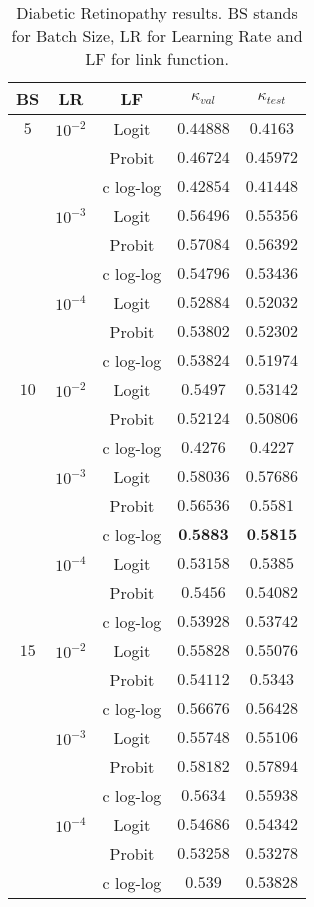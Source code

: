 \documentclass[10pt, a4paper, titlepage, twocolumn]{article}
\begin{document}
	\begin{table}[ht]
		\footnotesize
		\centering
		\begin{tabular}{ccc|cc}
			BS & LR & LF & $\kappa_{val}$ & $\kappa_{test}$\\\hline\addlinespace[0.05cm]
			$5$ & $10^{-2}$ & Logit & $0.44888$ & $0.4163$\\
			& & Probit & $0.46724$ & $0.45972$\\
			& & c log-log & $0.42854$ & $0.41448$\\
			& $10^{-3}$ & Logit & $0.56496$ & $0.55356$\\
			& & Probit & $0.57084$ & $0.56392$\\
			& & c log-log & $0.54796$ & $0.53436$\\
			& $10^{-4}$ & Logit & $0.52884$ & $0.52032$\\
			& & Probit & $0.53802$ & $0.52302$\\
			& & c log-log & $0.53824$ & $0.51974$\\
			$10$ & $10^{-2}$ & Logit & $0.5497$ & $0.53142$\\
			& & Probit & $0.52124$ & $0.50806$\\
			& & c log-log & $0.4276$ & $0.4227$\\
			& $10^{-3}$ & Logit & $0.58036$ & $0.57686$\\
			& & Probit & $0.56536$ & $0.5581$\\
			& & c log-log & $\textbf{0.5883}$ & $\textbf{0.5815}$\\
			& $10^{-4}$ & Logit & $0.53158$ & $0.5385$\\
			& & Probit & $0.5456$ & $0.54082$\\
			& & c log-log & $0.53928$ & $0.53742$\\
			$15$ & $10^{-2}$ & Logit & $0.55828$ & $0.55076$\\
			& & Probit & $0.54112$ & $0.5343$\\
			& & c log-log & $0.56676$ & $0.56428$\\
			& $10^{-3}$ & Logit & $0.55748$ & $0.55106$\\
			& & Probit & $0.58182$ & $0.57894$\\
			& & c log-log & $0.5634$ & $0.55938$\\
			& $10^{-4}$ & Logit & $0.54686$ & $0.54342$\\
			& & Probit & $0.53258$ & $0.53278$\\
			& & c log-log & $0.539$ & $0.53828$
		\end{tabular}
		\caption{Diabetic Retinopathy results. BS stands for Batch Size, LR for Learning Rate and LF for link function.}
		\label{table:DRresults}
	\end{table}
	
\end{document}

